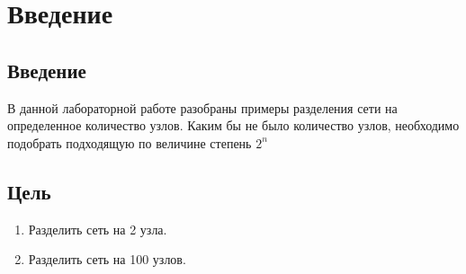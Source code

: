 \chapter{Введение}
\label{ch:intro}

\section{Введение}
В данной лабораторной работе разобраны примеры разделения сети на определенное
количество узлов. Каким бы не было количество узлов, необходимо подобрать подходящую по
величине степень $2^n$

\section{Цель}  

\begin{enumerate}
    \item Разделить сеть на 2 узла.
    \item Разделить сеть на 100 узлов.
\end{enumerate}
  
\endinput 